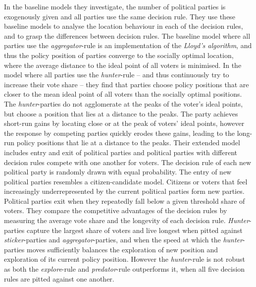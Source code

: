 \documentclass[preprint, 12pt]{elsarticle}
\begin{document}
In the baseline models they investigate, the number of political parties is exogenously given and all parties use the same decision rule. They use these baseline models to analyse the location behaviour in each of the decision rules, and to grasp the differences between decision rules. The baseline model where all parties use the \emph{aggregator}-rule is an implementation of the \emph{Lloyd's algorithm}, and thus the policy position of parties converge to the socially optimal location, where the average distance to the ideal point of all voters is minimised. In the model where all parties use the \emph{hunter}-rule -- and thus continuously try to increase their vote share -- they find that parties choose policy positions that are closer to the mean ideal point of all voters than the socially optimal positions. The \emph{hunter}-parties do not agglomerate at the peaks of the voter's ideal points, but choose a position that lies at a distance to the peaks. The party achieves short-run gains by locating close or at the peak of voters' ideal points, however the response by competing parties quickly erodes these gains, leading to the long-run policy positions that lie at a distance to the peaks. Their extended model includes entry and exit of political parties and political parties with different decision rules compete with one another for voters. The decision rule of each new political party is randomly drawn with equal probability. The entry of new political parties resembles a citizen-candidate model. Citizens or voters that feel increasingly underrepresented by the current political parties form new parties. Political parties exit when they repeatedly fall below a given threshold share of voters. They compare the competitive advantages of the decision rules by measuring the average vote share and the longevity of each decision rule. \emph{Hunter}-parties capture the largest share of voters and live longest when pitted against \emph{sticker}-parties and \emph{aggregator}-parties, and when the speed at which the \emph{hunter}-parties moves sufficiently balances the exploration of new position and exploration of its current policy position. However the \emph{hunter}-rule is not robust as both the \emph{explore}-rule and \emph{predator}-rule outperforms it, when all five decision rules are pitted against one another. 
\end{document}
